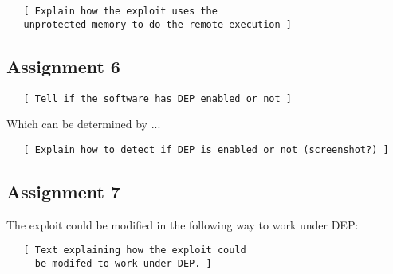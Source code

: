 \documentclass[10pt]{article}
\begin{document}
      \begin{verbatim}
   [ Explain how the exploit uses the
   unprotected memory to do the remote execution ]
      \end{verbatim}

    \subsection{Assignment 6}

      \begin{verbatim}
   [ Tell if the software has DEP enabled or not ]
      \end{verbatim}

      Which can be determined by ...

      \begin{verbatim}
   [ Explain how to detect if DEP is enabled or not (screenshot?) ]
      \end{verbatim}


    \subsection{Assignment 7}

      The exploit could be modified in the following way to work under DEP:

      \begin{verbatim}
   [ Text explaining how the exploit could
     be modifed to work under DEP. ]
      \end{verbatim}
\end{document}
